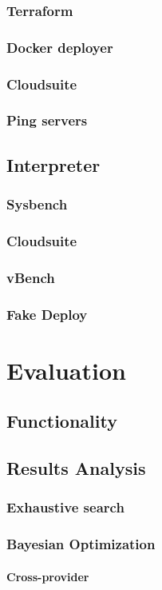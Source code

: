 \documentclass{report}
\begin{document}
\subsection{Terraform}
\subsection{Docker deployer}
\subsection{Cloudsuite}
\subsection{Ping servers}
\section{Interpreter}
\subsection{Sysbench}
\subsection{Cloudsuite}
\subsection{vBench}
\subsection{Fake Deploy}
\chapter{Evaluation}
\section{Functionality}
\section{Results Analysis}
\subsection{Exhaustive search}
\subsection{Bayesian Optimization}
\subsubsection{Cross-provider}
\end{document}
